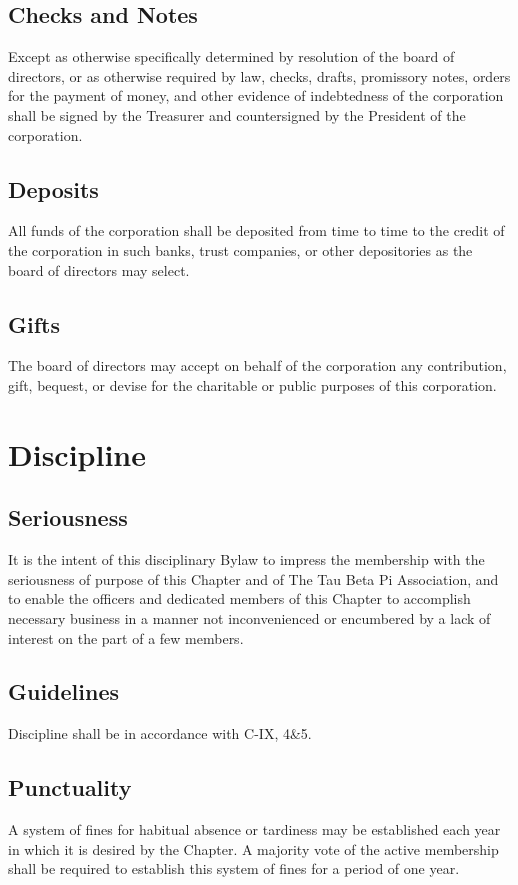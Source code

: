 \documentclass{article}
\begin{document}
	\subsection{Checks and Notes}
	Except as otherwise specifically determined by resolution of the board of directors, or as otherwise required by law, checks, drafts, promissory notes, orders for the payment of money, and other evidence of indebtedness of the corporation shall be signed by the Treasurer and countersigned by the President of the corporation.
	\subsection{Deposits}
	All funds of the corporation shall be deposited from time to time to the credit of the corporation in such banks, trust companies, or other depositories as the board of directors may select.
	\subsection{Gifts}
	The board of directors may accept on behalf of the corporation any contribution, gift, bequest, or devise for the charitable or public purposes of this corporation.
	
	\section{Discipline}
	\subsection{Seriousness}
	It is the intent of this disciplinary Bylaw to impress the membership with the seriousness of purpose of this Chapter and of The Tau Beta Pi Association, and to enable the officers and dedicated members of this Chapter to accomplish necessary business in a manner not inconvenienced or encumbered by a lack of interest on the part of a few members.
	\subsection{Guidelines}
	Discipline shall be in accordance with C-IX, 4\&5.
	\subsection{Punctuality}
	A system of fines for habitual absence or tardiness may be established each year in which it is desired by the Chapter. A majority vote of the active membership shall be required to establish this system of fines for a period of one year.
	
\end{document}
